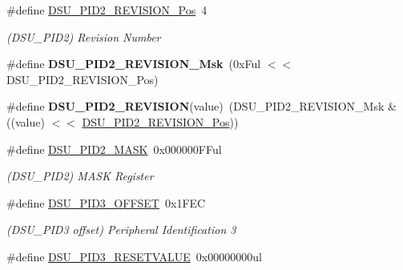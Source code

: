 \begin{DoxyCompactItemize}
\item 
\hypertarget{group___s_a_m_l21___d_s_u_gacb24de7b25b93dd1c040ed75899fd545}{}\#define \hyperlink{group___s_a_m_l21___d_s_u_gacb24de7b25b93dd1c040ed75899fd545}{D\+S\+U\+\_\+\+P\+I\+D2\+\_\+\+R\+E\+V\+I\+S\+I\+O\+N\+\_\+\+Pos}~4\label{group___s_a_m_l21___d_s_u_gacb24de7b25b93dd1c040ed75899fd545}

\begin{DoxyCompactList}\small\item\em (D\+S\+U\+\_\+\+P\+I\+D2) Revision Number \end{DoxyCompactList}\item 
\hypertarget{group___s_a_m_l21___d_s_u_ga82145131b9b62c23c97969def2900d5d}{}\#define {\bfseries D\+S\+U\+\_\+\+P\+I\+D2\+\_\+\+R\+E\+V\+I\+S\+I\+O\+N\+\_\+\+Msk}~(0x\+Ful $<$$<$ D\+S\+U\+\_\+\+P\+I\+D2\+\_\+\+R\+E\+V\+I\+S\+I\+O\+N\+\_\+\+Pos)\label{group___s_a_m_l21___d_s_u_ga82145131b9b62c23c97969def2900d5d}

\item 
\hypertarget{group___s_a_m_l21___d_s_u_ga2aded9774af773c83f88843254b3921b}{}\#define {\bfseries D\+S\+U\+\_\+\+P\+I\+D2\+\_\+\+R\+E\+V\+I\+S\+I\+O\+N}(value)~(D\+S\+U\+\_\+\+P\+I\+D2\+\_\+\+R\+E\+V\+I\+S\+I\+O\+N\+\_\+\+Msk \& ((value) $<$$<$ \hyperlink{group___s_a_m_l21___d_s_u_gacb24de7b25b93dd1c040ed75899fd545}{D\+S\+U\+\_\+\+P\+I\+D2\+\_\+\+R\+E\+V\+I\+S\+I\+O\+N\+\_\+\+Pos}))\label{group___s_a_m_l21___d_s_u_ga2aded9774af773c83f88843254b3921b}

\item 
\hypertarget{group___s_a_m_l21___d_s_u_ga4166d965b2c546c98a12d698fd27aa37}{}\#define \hyperlink{group___s_a_m_l21___d_s_u_ga4166d965b2c546c98a12d698fd27aa37}{D\+S\+U\+\_\+\+P\+I\+D2\+\_\+\+M\+A\+S\+K}~0x000000\+F\+Ful\label{group___s_a_m_l21___d_s_u_ga4166d965b2c546c98a12d698fd27aa37}

\begin{DoxyCompactList}\small\item\em (D\+S\+U\+\_\+\+P\+I\+D2) M\+A\+S\+K Register \end{DoxyCompactList}\item 
\hypertarget{group___s_a_m_l21___d_s_u_ga0dadf53ca912be72cc37e2eddedbacfa}{}\#define \hyperlink{group___s_a_m_l21___d_s_u_ga0dadf53ca912be72cc37e2eddedbacfa}{D\+S\+U\+\_\+\+P\+I\+D3\+\_\+\+O\+F\+F\+S\+E\+T}~0x1\+F\+E\+C\label{group___s_a_m_l21___d_s_u_ga0dadf53ca912be72cc37e2eddedbacfa}

\begin{DoxyCompactList}\small\item\em (D\+S\+U\+\_\+\+P\+I\+D3 offset) Peripheral Identification 3 \end{DoxyCompactList}\item 
\hypertarget{group___s_a_m_l21___d_s_u_gaaf4259207024e68a7734aa815f281bb2}{}\#define \hyperlink{group___s_a_m_l21___d_s_u_gaaf4259207024e68a7734aa815f281bb2}{D\+S\+U\+\_\+\+P\+I\+D3\+\_\+\+R\+E\+S\+E\+T\+V\+A\+L\+U\+E}~0x00000000ul\label{group___s_a_m_l21___d_s_u_gaaf4259207024e68a7734aa815f281bb2}


\end{DoxyCompactItemize}
